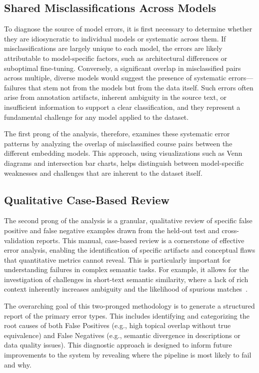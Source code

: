 \subsection{Shared Misclassifications Across Models}\label{ch:3.5.1}
To diagnose the source of model errors, it is first necessary to determine whether they are idiosyncratic to individual models or systematic across them. If misclassifications are largely unique to each model, the errors are likely attributable to model-specific factors, such as architectural differences or suboptimal fine-tuning. Conversely, a significant overlap in misclassified pairs across multiple, diverse models would suggest the presence of systematic errors—failures that stem not from the models but from the data itself. Such errors often arise from annotation artifacts, inherent ambiguity in the source text, or insufficient information to support a clear classification, and they represent a fundamental challenge for any model applied to the dataset.

The first prong of the analysis, therefore, examines these systematic error patterns by analyzing the overlap of misclassified course pairs between the different embedding models. This approach, using visualizations such as Venn diagrams and intersection bar charts, helps distinguish between model-specific weaknesses and challenges that are inherent to the dataset itself.

\subsection{Qualitative Case-Based Review}\label{ch:3.5.2}
The second prong of the analysis is a granular, qualitative review of specific false positive and false negative examples drawn from the held-out test and cross-validation reports. This manual, case-based review is a cornerstone of effective error analysis, enabling the identification of specific artifacts and conceptual flaws that quantitative metrics cannot reveal. This is particularly important for understanding failures in complex semantic tasks. For example, it allows for the investigation of challenges in short-text semantic similarity, where a lack of rich context inherently increases ambiguity and the likelihood of spurious matches~\cite{app13063911}.

The overarching goal of this two-pronged methodology is to generate a structured report of the primary error types. This includes identifying and categorizing the root causes of both False Positives (e.g., high topical overlap without true equivalence) and False Negatives (e.g., semantic divergence in descriptions or data quality issues). This diagnostic approach is designed to inform future improvements to the system by revealing where the pipeline is most likely to fail and why.